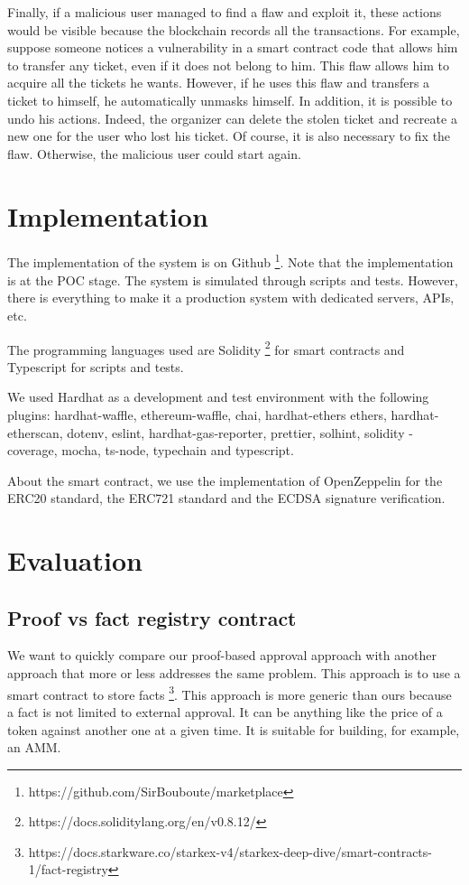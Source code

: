\documentclass[a4paper,11pt,oneside]{report}
\begin{document}
Finally, if a malicious user managed to find a flaw and exploit it, these actions would be visible because the blockchain records all the transactions. For example, suppose someone notices a vulnerability in a smart contract code that allows him to transfer any ticket, even if it does not belong to him. This flaw allows him to acquire all the tickets he wants. However, if he uses this flaw and transfers a ticket to himself, he automatically unmasks himself. In addition, it is possible to undo his actions. Indeed, the organizer can delete the stolen ticket and recreate a new one for the user who lost his ticket. Of course, it is also necessary to fix the flaw. Otherwise, the malicious user could start again.

\chapter{Implementation}
The implementation of the system is on Github \footnote{https://github.com/SirBouboute/marketplace}. Note that the implementation is at the POC stage. The system is simulated through scripts and tests. However, there is everything to make it a production system with dedicated servers, APIs, etc.

The programming languages used are Solidity \footnote{https://docs.soliditylang.org/en/v0.8.12/} for smart contracts and Typescript for scripts and tests.

We used Hardhat as a development and test environment with the following plugins: hardhat-waffle, ethereum-waffle, chai, hardhat-ethers ethers, hardhat-etherscan, dotenv, eslint, hardhat-gas-reporter, prettier, solhint, solidity -coverage, mocha, ts-node, typechain and typescript. 

About the smart contract, we use the implementation of OpenZeppelin for the ERC20 standard, the ERC721 standard and the ECDSA signature verification.

\chapter{Evaluation}
\section{Proof vs fact registry contract}
We want to quickly compare our proof-based approval approach with another approach that more or less addresses the same problem. This approach is to use a smart contract to store facts \footnote{https://docs.starkware.co/starkex-v4/starkex-deep-dive/smart-contracts-1/fact-registry}. This approach is more generic than ours because a fact is not limited to external approval. It can be anything like the price of a token against another one at a given time. It is suitable for building, for example, an AMM. 
\end{document}

